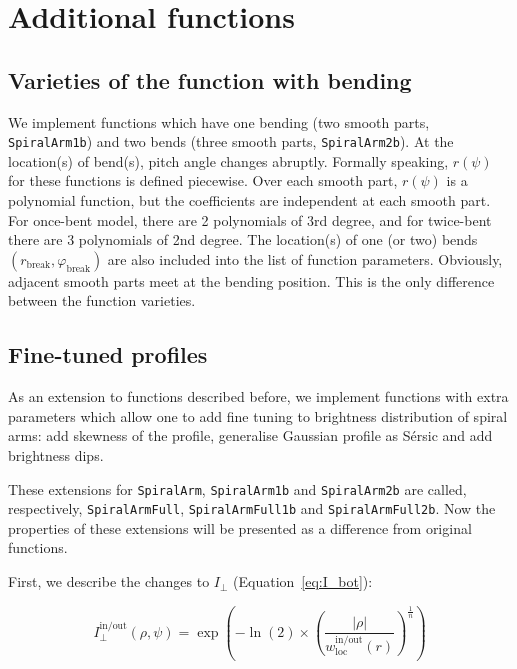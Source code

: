 \documentclass[12pt,a4paper]{article}
\begin{document}
\section{Additional functions}
\label{sec:add_functions}

\subsection{Varieties of the function with bending}
\label{sec:bending}
We implement functions which have one bending (two smooth parts, \verb*|SpiralArm1b|) and two bends (three smooth parts, \verb*|SpiralArm2b|). At the location(s) of bend(s), pitch angle changes abruptly. Formally speaking, $r(\psi)$ for these functions is defined piecewise. Over each smooth part, $r(\psi)$ is a polynomial function, but the coefficients are independent at each smooth part. For once-bent model, there are 2 polynomials of 3rd degree, and for twice-bent there are 3 polynomials of 2nd degree. The location(s) of one (or two) bends $(r_\text{break}, \varphi_\text{break})$ are also included into the list of function parameters. Obviously, adjacent smooth parts meet at the bending position. This is the only difference between the function varieties.

\subsection{Fine-tuned profiles}
\label{sec:fine_tuned}

As an extension to functions described before, we implement functions with extra parameters which allow one to add fine tuning to brightness distribution of spiral arms: add skewness of the profile, generalise Gaussian profile as S{\'e}rsic and add brightness dips.

These extensions for \verb*|SpiralArm|, \verb*|SpiralArm1b| and \verb*|SpiralArm2b| are called, respectively, \verb*|SpiralArmFull|, \verb*|SpiralArmFull1b| and \verb*|SpiralArmFull2b|. Now the properties of these extensions will be presented as a difference from original functions.

First, we describe the changes to $I_\bot$ (Equation~\ref{eq:I_bot}):

\begin{equation}
	I_\bot^\text{in/out}(\rho, \psi) = \exp \left(-\ln(2) \times \left( \frac{|\rho|}{w_\text{loc}^\text{in/out}(r)} \right)^{\frac{1}{n}} \right)
\end{equation}
\end{document}

